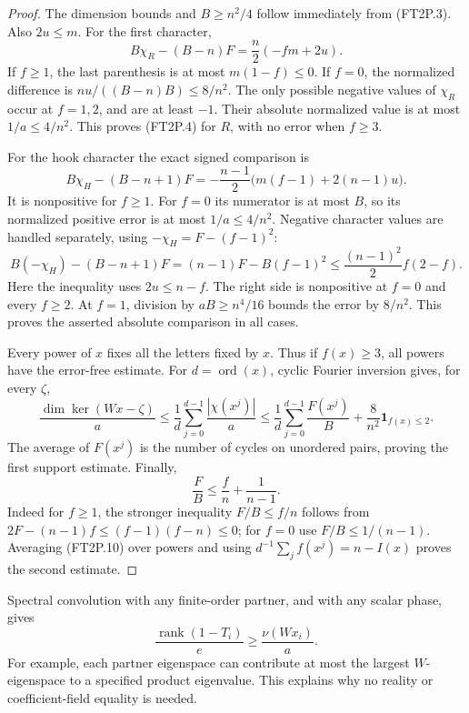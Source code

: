 \begin{proof}
The dimension bounds and \(B\ge n^2/4\) follow immediately from
(FT2P.3).  Also \(2u\le m\).  For the first character,
\[
 B\chi_R-(B-n)F
       =\frac n2(-fm+2u).
 \tag{FT2P.6}
\]
If \(f\ge1\), the last parenthesis is at most \(m(1-f)\le0\).
If \(f=0\), the normalized difference is
\(nu/((B-n)B)\le8/n^2\).
The only possible negative values of \(\chi_R\) occur at \(f=1,2\),
and are at least \(-1\).  Their absolute normalized value is at most
\(1/a\le4/n^2\).  This proves (FT2P.4) for \(R\), with no error
when \(f\ge3\).

For the hook character the exact signed comparison is
\[
 B\chi_H-(B-n+1)F
   =-\frac{n-1}{2}\bigl(m(f-1)+2(n-1)u\bigr).
 \tag{FT2P.7}
\]
It is nonpositive for \(f\ge1\).  For \(f=0\) its numerator is
at most \(B\), so its normalized positive error is at most
\(1/a\le4/n^2\).  Negative character values are handled separately,
using \(-\chi_H=F-(f-1)^2\):
\[
 B(-\chi_H)-(B-n+1)F
   =(n-1)F-B(f-1)^2
   \le\frac{(n-1)^2}{2}f(2-f).
 \tag{FT2P.8}
\]
Here the inequality uses \(2u\le n-f\).  The right side is
nonpositive at \(f=0\) and every \(f\ge2\).  At \(f=1\), division
by \(aB\ge n^4/16\) bounds the error by \(8/n^2\).
This proves the asserted absolute comparison in all cases.

Every power of \(x\) fixes all the letters fixed by \(x\).  Thus
if \(f(x)\ge3\), all powers have the error-free estimate.
For \(d=\operatorname{ord}(x)\), cyclic Fourier inversion gives,
for every \(\zeta\),
\[
 \frac{\dim\ker(Wx-\zeta)}a
 \le\frac1d\sum_{j=0}^{d-1}\frac{|\chi(x^j)|}a
 \le\frac1d\sum_{j=0}^{d-1}\frac{F(x^j)}B
                       +\frac8{n^2}\mathbf1_{f(x)\le2}.
 \tag{FT2P.9}
\]
The average of \(F(x^j)\) is the number of cycles on unordered
pairs, proving the first support estimate.
Finally,
\[
 \frac FB\le\frac fn+\frac1{n-1}.
 \tag{FT2P.10}
\]
Indeed for \(f\ge1\), the stronger inequality \(F/B\le f/n\)
follows from
\(2F-(n-1)f\le(f-1)(f-n)\le0\); for \(f=0\) use
\(F/B\le1/(n-1)\).  Averaging (FT2P.10) over powers and using
\(d^{-1}\sum_j f(x^j)=n-I(x)\) proves the second estimate.
\end{proof}

Spectral convolution with any finite-order partner, and with any
scalar phase, gives
\[
 \frac{\operatorname{rank}(1-T_i)}e\ge\frac{\nu(Wx_i)}a.
 \tag{FT2P.11}
\]
For example, each partner eigenspace can contribute at most the
largest \(W\)-eigenspace to a specified product eigenvalue.  This
explains why no reality or coefficient-field equality is needed.

